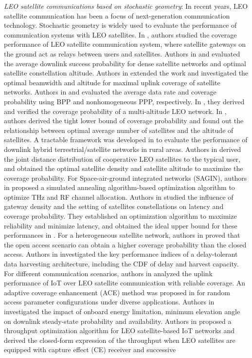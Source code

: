\indent \textit{LEO satellite communications based on stochastic geometry}: In recent years, LEO satellite communication has been a focus of next-generation communication technology. Stochastic geometry is widely used to evaluate the performance of communication systems with LEO satellites. In \cite{talgat2020stochastic}, authors studied the coverage performance of LEO satellite communication system, where satellite gateways on the ground act as relays between users and satellites. Authors in \cite{al2021analytic} and \cite{al2021optimal} evaluated the average downlink success probability for dense satellite networks and optimal satellite constellation altitude. Authors in \cite{al2022optimal} extended the work and investigated the optimal beamwidth and altitude for maximal uplink coverage of satellite networks. Authors in \cite{okati2020downlink} and \cite{okati2022nonhomogeneous} evaluated the average data rate and coverage probability using BPP and nonhomogeneous PPP, respectively. In \cite{okati2023stochastic}, they derived and verified the coverage probability of a multi-altitude LEO network. In \cite{park2022tractable}, authors derived the tight lower bound of coverage probability and found out the relationship between optimal average number of satellites and the altitude of satellites. A tractable framework was developed in \cite{salem2023exploiting} to evaluate the performance of downlink hybrid terrestrial/satellite networks in rural areas. Authors in \cite{shang2023coverage} derived the joint distance distribution of cooperative LEO satellites to the typical user, and obtained the optimal satellite density and satellite altitude to maximize the coverage probability. For Space-air-ground integrated networks (SAGIN), authors in \cite{yuan2023joint} proposed a simulated annealing algorithm-based optimization algorithm to optimize THz and RF channel allocation. Authors in \cite{wang2022ultra} studied the influence of gateway density and the setting of satellites constellations on latency and coverage probability. They established an optimization algorithm to maximize reliability and minimize latency, and obtained the ideal upper bound for these performances in \cite{wang2024ultra}. For a heterogeneous satellite network, authors in \cite{choi2024modeling} proved that the open access scenario can obtain a higher coverage probability than the closed access. Authors in \cite{choi2024analysis} investigated the key performance indices of a delay-tolerant data harvesting architecture, including the CDF of delay and harvest capacity. For different communication scenarios, authors in \cite{talgat2024stochastic} analyzed the uplink performance of IoT over LEO satellite communication with reliable coverage. An adaptive coverage enhancement (ACE) method was proposed in \cite{hong2024narrowband} for random access parameter configurations under diverse applications. Authors in \cite{bliss2024orchestrating} investigated the impact of onboard energy limitation, minimum elevation angle on downlink steady-state probability and availability. Authors in \cite{taojoint} proposed a throughput optimization algorithm for LEO satellite-based IoT networks and derived the closed-form expression of the throughput when LEO satellites are equipped with capture effect (CE) receiver and successive 